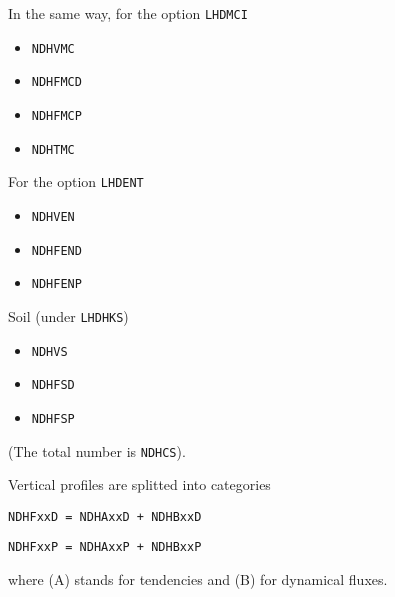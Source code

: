 In the same way, for the option {\tt LHDMCI}
\begin{itemize}
\item {\tt NDHVMC}
\item {\tt NDHFMCD}
\item {\tt NDHFMCP}
\item {\tt NDHTMC}
\end{itemize}

For the option {\tt LHDENT}
\begin{itemize}
\item {\tt NDHVEN}
\item {\tt NDHFEND}
\item {\tt NDHFENP}
\end{itemize}

Soil (under {\tt LHDHKS})
\begin{itemize}
\item {\tt NDHVS}
\item {\tt NDHFSD}
\item {\tt NDHFSP}
\end{itemize}

\noi (The total number is {\tt NDHCS}).

\ms
Vertical profiles are splitted into categories
\newline \centerline{\tt NDHFxxD = NDHAxxD + NDHBxxD}
\newline \centerline{\tt NDHFxxP = NDHAxxP + NDHBxxP}

where (A) stands for tendencies and (B) for dynamical fluxes. 

